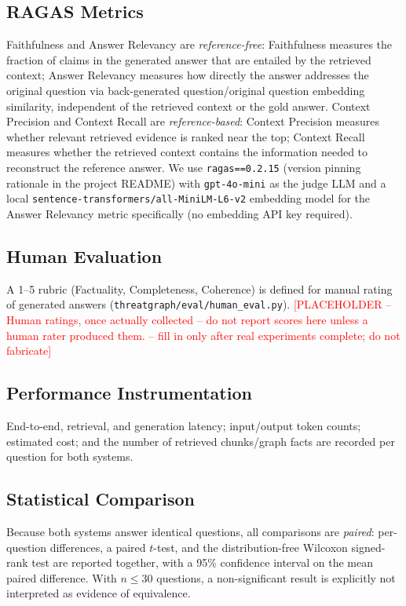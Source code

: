 \documentclass[conference]{IEEEtran}
\newcommand{\todoplaceholder}[1]{\textcolor{red}{[PLACEHOLDER -- #1 -- fill in only after real experiments complete; do not fabricate]}}
\begin{document}
\subsection{RAGAS Metrics}
Faithfulness and Answer Relevancy are \emph{reference-free}: Faithfulness
measures the fraction of claims in the generated answer that are entailed
by the retrieved context; Answer Relevancy measures how directly the answer
addresses the original question via back-generated question/original
question embedding similarity, independent of the retrieved context or the
gold answer. Context Precision and Context Recall are \emph{reference-based}:
Context Precision measures whether relevant retrieved evidence is ranked
near the top; Context Recall measures whether the retrieved context
contains the information needed to reconstruct the reference answer. We use
\texttt{ragas==0.2.15} (version pinning rationale in the project README) with
\texttt{gpt-4o-mini} as the judge LLM and a local
\texttt{sentence-transformers/all-MiniLM-L6-v2} embedding model for the
Answer Relevancy metric specifically (no embedding API key required).

\subsection{Human Evaluation}
A 1--5 rubric (Factuality, Completeness, Coherence) is defined for manual
rating of generated answers (\texttt{threatgraph/eval/human\_eval.py}).
\todoplaceholder{Human ratings, once actually collected -- do not report
scores here unless a human rater produced them.}

\subsection{Performance Instrumentation}
End-to-end, retrieval, and generation latency; input/output token counts;
estimated cost; and the number of retrieved chunks/graph facts are recorded
per question for both systems.

\subsection{Statistical Comparison}
Because both systems answer identical questions, all comparisons are
\emph{paired}: per-question differences, a paired $t$-test, and the
distribution-free Wilcoxon signed-rank test are reported together, with a
95\% confidence interval on the mean paired difference. With $n \le 30$
questions, a non-significant result is explicitly not interpreted as
evidence of equivalence.
\end{document}
